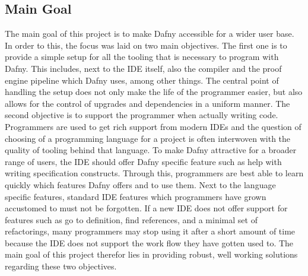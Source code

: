 \subsection{Main Goal}\label{mainGoal}
The main goal of this project is to make Dafny accessible for a wider user base. In order to this, the focus was laid on two main objectives. \newline
The first one is to provide a simple setup for all the tooling that is necessary to program with Dafny. This includes, next to the IDE itself, also the compiler and the proof engine pipeline which Dafny uses, among other things. The central point of handling the setup does not only make the life of the programmer easier, but also allows for the control of upgrades and dependencies in a uniform manner. \newline
The second objective is to support the programmer when actually writing code. Programmers are used to get rich support from modern IDEs and the question of choosing of a programming language for a project is often interwoven with the quality of tooling behind that language. To make Dafny attractive for a broader range of users, the IDE should offer Dafny specific feature such as help with writing specification constructs. Through this, programmers are best able to learn quickly which features Dafny offers and to use them. Next to the language specific features, standard IDE features which programmers have grown accustomed to must not be forgotten. If a new IDE does not offer support for features such as go to definition, find references, and a minimal set of refactorings, many programmers may stop using it after a short amount of time because the IDE does not support the work flow they have gotten used to. \newline
The main goal of this project therefor lies in providing robust, well working solutions regarding these two objectives. \newline